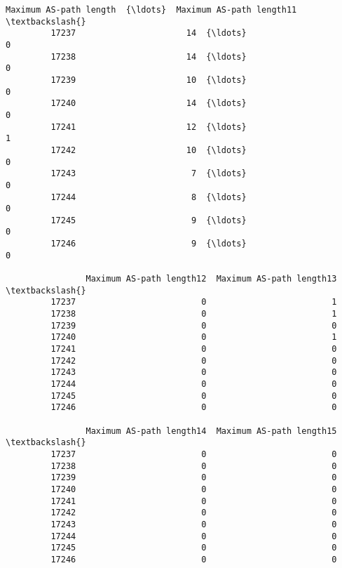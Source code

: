 \documentclass[11pt]{article}
\begin{document}
\begin{Verbatim}[commandchars=\\\{\}]
                Maximum AS-path length  {\ldots}  Maximum AS-path length11  \textbackslash{}
         17237                      14  {\ldots}                         0   
         17238                      14  {\ldots}                         0   
         17239                      10  {\ldots}                         0   
         17240                      14  {\ldots}                         0   
         17241                      12  {\ldots}                         1   
         17242                      10  {\ldots}                         0   
         17243                       7  {\ldots}                         0   
         17244                       8  {\ldots}                         0   
         17245                       9  {\ldots}                         0   
         17246                       9  {\ldots}                         0   
         
                Maximum AS-path length12  Maximum AS-path length13  \textbackslash{}
         17237                         0                         1   
         17238                         0                         1   
         17239                         0                         0   
         17240                         0                         1   
         17241                         0                         0   
         17242                         0                         0   
         17243                         0                         0   
         17244                         0                         0   
         17245                         0                         0   
         17246                         0                         0   
         
                Maximum AS-path length14  Maximum AS-path length15  \textbackslash{}
         17237                         0                         0   
         17238                         0                         0   
         17239                         0                         0   
         17240                         0                         0   
         17241                         0                         0   
         17242                         0                         0   
         17243                         0                         0   
         17244                         0                         0   
         17245                         0                         0   
         17246                         0                         0   
         

\end{Verbatim}
\end{document}
